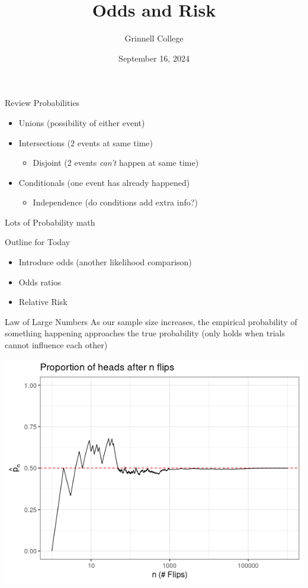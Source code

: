 \documentclass{beamer}
\title[SST-115 / STA-209]{Odds and Risk}
\subtitle{}
\author{Grinnell College}
\date{September 16, 2024}
\begin{document}
\begin{frame}
  \titlepage
\end{frame}

\begin{frame}{Review}
Probabilities
\begin{itemize}
    \item Unions (possibility of either event)
    \item Intersections (2 events at same time)
    \begin{itemize}
        \item Disjoint (2 events \textit{can't} happen at same time)
    \end{itemize}
    \item Conditionals (one event has already happened)
    \begin{itemize}
        \item Independence (do conditions add extra info?) 
    \end{itemize} \vspace{4mm}
\end{itemize}
Lots of Probability math
\end{frame}

\begin{frame}{Outline for Today}
\begin{itemize}
\item Introduce odds (another likelihood comparison)
\item Odds ratios
\item Relative Risk
\end{itemize}
\end{frame}

\begin{frame}{Law of Large Numbers}
As our sample size increases, the empirical probability of something happening approaches the true probability (only holds when trials cannot influence each other)
\begin{center}
    \includegraphics[scale=.4]{img/lln_flip.png}
\end{center}
\end{frame}
\end{document}
